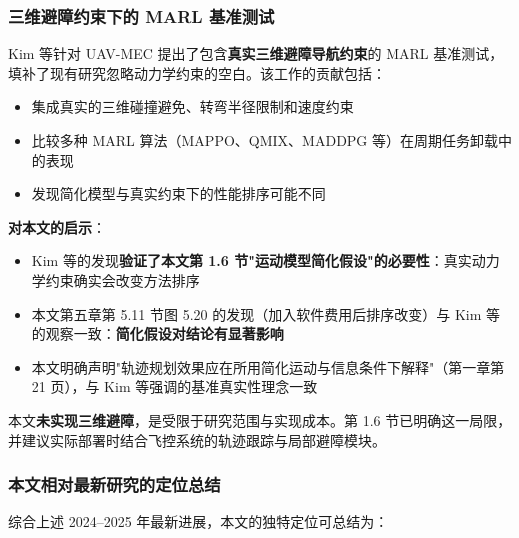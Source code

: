 \subsubsection{三维避障约束下的 MARL 基准测试}

Kim 等针对 UAV-MEC 提出了包含\textbf{真实三维避障导航约束}的 MARL 基准测试\cite{kim2024benchmarking}，填补了现有研究忽略动力学约束的空白。该工作的贡献包括：
\begin{itemize}
    \item 集成真实的三维碰撞避免、转弯半径限制和速度约束
    \item 比较多种 MARL 算法（MAPPO、QMIX、MADDPG 等）在周期任务卸载中的表现
    \item 发现简化模型与真实约束下的性能排序可能不同
\end{itemize}

\textbf{对本文的启示}：
\begin{itemize}
    \item Kim 等的发现\textbf{验证了本文第 1.6 节"运动模型简化假设"的必要性}：真实动力学约束确实会改变方法排序
    \item 本文第五章第 5.11 节图 5.20 的发现（加入软件费用后排序改变）与 Kim 等的观察一致：\textbf{简化假设对结论有显著影响}
    \item 本文明确声明"轨迹规划效果应在所用简化运动与信息条件下解释"（第一章第 21 页），与 Kim 等强调的基准真实性理念一致
\end{itemize}

本文\textbf{未实现三维避障}，是受限于研究范围与实现成本。第 1.6 节已明确这一局限，并建议实际部署时结合飞控系统的轨迹跟踪与局部避障模块。

\subsubsection{本文相对最新研究的定位总结}

综合上述 2024--2025 年最新进展，本文的独特定位可总结为：

